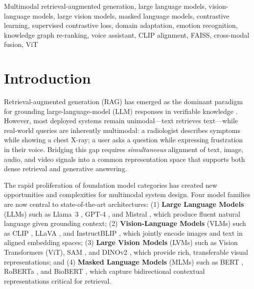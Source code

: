 \documentclass[10pt,conference]{IEEEtran}
\theoremstyle{ieeethm}
\theoremstyle{ieeedef}
\theoremstyle{ieeeremark}
\begin{document}
\begin{IEEEkeywords}
Multimodal retrieval-augmented generation, large language models, vision-language models, large vision models, masked language models, contrastive learning, supervised contrastive loss, domain adaptation, emotion recognition, knowledge graph re-ranking, voice assistant, CLIP alignment, FAISS, cross-modal fusion, ViT
\end{IEEEkeywords}

\section{Introduction}
\label{sec:intro}

Retrieval-augmented generation (RAG) has emerged as the dominant paradigm for grounding large-language-model (LLM) responses in verifiable knowledge \cite{lewis2020retrieval}. However, most deployed systems remain unimodal---text retrieves text---while real-world queries are inherently multimodal: a radiologist describes symptoms while showing a chest X-ray; a user asks a question while expressing frustration in their voice. Bridging this gap requires \emph{simultaneous} alignment of text, image, audio, and video signals into a common representation space that supports both dense retrieval and generative answering.

The rapid proliferation of foundation model categories has created new opportunities and complexities for multimodal system design. Four model families are now central to state-of-the-art architectures: (1) \textbf{Large Language Models} (LLMs) such as Llama~3 \cite{touvron2023llama}, GPT-4 \cite{achiam2023gpt4}, and Mistral \cite{jiang2023mistral}, which produce fluent natural language given grounding context; (2) \textbf{Vision-Language Models} (VLMs) such as CLIP \cite{radford2021learning}, LLaVA \cite{liu2023llava}, and InstructBLIP \cite{dai2023instructblip}, which jointly encode images and text in aligned embedding spaces; (3) \textbf{Large Vision Models} (LVMs) such as Vision Transformers \cite{dosovitskiy2020image} (ViT), SAM \cite{kirillov2023sam}, and DINOv2 \cite{oquab2024dinov2}, which provide rich, transferable visual representations; and (4) \textbf{Masked Language Models} (MLMs) such as BERT \cite{devlin2019bert}, RoBERTa \cite{liu2019roberta}, and BioBERT \cite{lee2020biobert}, which capture bidirectional contextual representations critical for retrieval.
\end{document}
